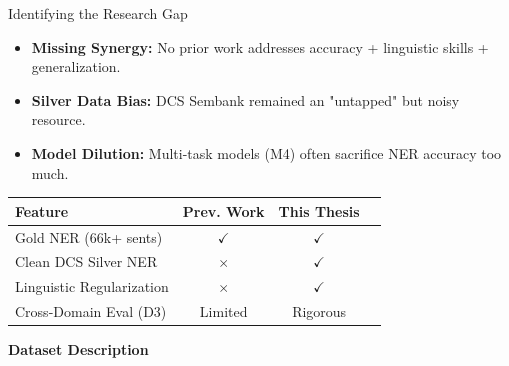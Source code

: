 \documentclass[10pt]{beamer}
\def\tpage{}
\newcommand{\tp}[1]{\def\tpage{#1}}
\begin{document}
\begin{frame}{Identifying the Research Gap}
    \tp{7}
    \begin{itemize}
        \item \textbf{Missing Synergy:} No prior work addresses accuracy + linguistic skills + generalization.
        \item \textbf{Silver Data Bias:} DCS Sembank remained an "untapped" but noisy resource.
        \item \textbf{Model Dilution:} Multi-task models (M4) often sacrifice NER accuracy too much.
    \end{itemize}
    \vfill
    \begin{table}
        \centering
        \begin{tabular}{lccc}
            \toprule
            \textbf{Feature} & \textbf{Prev. Work} & \textbf{This Thesis} \\
            \midrule
            Gold NER (66k+ sents) & $\checkmark$ & $\checkmark$ \\
            Clean DCS Silver NER & $\times$ & $\checkmark$ \\
            Linguistic Regularization & $\times$ & $\checkmark$ \\
            Cross-Domain Eval (D3) & Limited & Rigorous \\
            \bottomrule
        \end{tabular}
    \end{table}
\end{frame}

\begin{frame}[plain]
    \tp{8}
    \begin{center}
        \Huge \textbf{\color{DIATNavy}Dataset Description}
    \end{center}
\end{frame}
\end{document}
